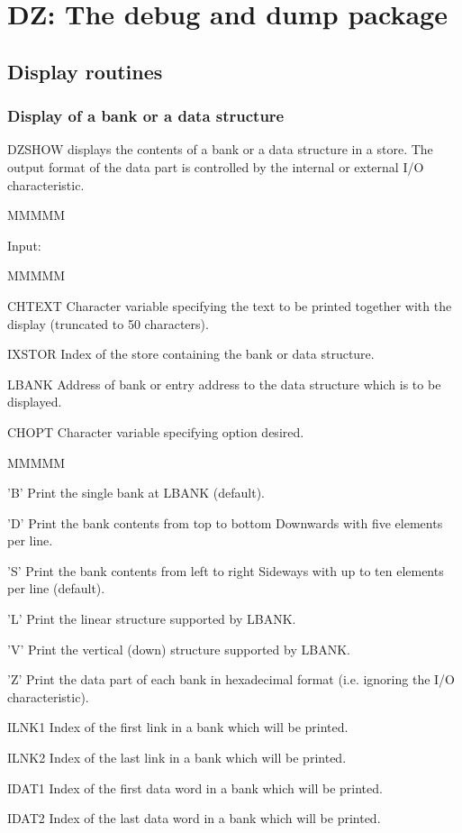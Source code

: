 \chapter{DZ: The debug and dump package}
\section{Display routines}
\subsection{Display of a bank or a data structure}
\par DZSHOW displays the contents of a bank or a data structure in a store.
The output format of the data part is controlled by the internal
or external I/O characteristic.
\begin{DL}{MMMMM}
\item[Input:
]
\begin{DL}{MMMMM}
\item[CHTEXT
]Character variable specifying the text to be printed
together with the display (truncated to 50 characters).
\item[IXSTOR
]Index of the store containing the bank or data structure.
\item[LBANK
]Address of bank or entry address to the data structure
which is to be displayed.
\item[CHOPT
]Character variable specifying option desired.
\begin{DL}{MMMMM}
\item['B'
]Print the single bank at LBANK (default).
\item['D'
]Print the bank contents from top to bottom Downwards
with five elements per line.
\item['S'
]Print the bank contents from left to right Sideways
with up to ten elements per line (default).
\item['L'
]Print the linear structure supported by LBANK.
\item['V'
]Print the vertical (down) structure supported by LBANK.
\item['Z'
]Print the data part of each bank in hexadecimal format
(i.e. ignoring the I/O characteristic).
\end{DL}
\item[ILNK1
]Index of the first link in a bank which will be printed.
\item[ILNK2
]Index of the last link in a bank which will be printed.
\item[IDAT1
]Index of the first data word in a bank which will be printed.
\item[IDAT2
]Index of the last data word in a bank which will be printed.
\end{DL}
\end{DL}
